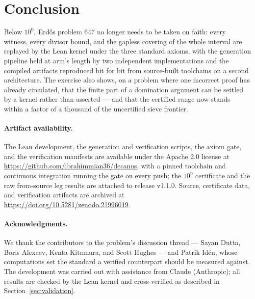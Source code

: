 \documentclass[11pt]{article}
\begin{document}
\section{Conclusion}\label{sec:conclusion}

Below $10^9$, Erd\H{o}s problem 647 no longer needs to be taken on
faith: every witness, every divisor bound, and the gapless covering of
the whole interval are replayed by the Lean kernel under the three
standard axioms, with the generation pipeline held at arm's length by
two independent implementations and the compiled artifacts reproduced
bit for bit from source-built toolchains on a second architecture. The
exercise also shows, on a problem where one incorrect proof has already
circulated, that the finite part of a domination argument can be
settled by a kernel rather than asserted --- and that the certified
range now stands within a factor of a thousand of the uncertified sieve
frontier.

\paragraph{Artifact availability.}
The Lean development, the generation and verification scripts, the
axiom gate, and the verification manifests are available under the
Apache 2.0 license at \url{https://github.com/ibrahimmian36/decanus},
with a pinned toolchain and continuous integration running the gate on
every push; the $10^9$ certificate and the raw from-source leg
results are attached to release v1.1.0. Source, certificate data, and
verification artifacts are archived at
\url{https://doi.org/10.5281/zenodo.21996019}.

\paragraph{Acknowledgments.}
We thank the contributors to the problem's discussion thread --- Sayan
Dutta, Boris Alexeev, Kenta Kitamura, and Scott Hughes --- and Patrik
Id\'en, whose computations set the standard a verified counterpart
should be measured against. The development was carried out with
assistance from Claude (Anthropic); all results are checked by the Lean
kernel and cross-verified as described in
Section~\ref{sec:validation}.
\end{document}

